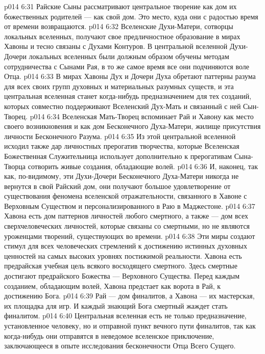 \vs p014 6:31 Райские Сыны рассматривают центральное творение как дом их божественных родителей --- как свой дом. Это место, куда они с радостью время от времени возвращаются.
\vs p014 6:32 \pc {}\bibnobreakspace {} Вселенские Духи\hyp{}Матери, сотворцы локальных вселенных, получают свое предличностное образование в мирах Хавоны и тесно связаны с Духами Контуров. В центральной вселенной Духи\hyp{}Дочери локальных вселенных были должным образом обучены методам сотрудничества с Сынами Рая, в то же самое время все они подчиняются воле Отца.
\vs p014 6:33 В мирах Хавоны Дух и Дочери Духа обретают паттерны разума для всех своих групп духовных и материальных разумных существ, и эта центральная вселенная станет когда\hyp{}нибудь предназначением для тех созданий, которых совместно поддерживают Вселенский Дух\hyp{}Мать и связанный с ней Сын\hyp{}Творец.
\vs p014 6:34 Вселенская Мать\hyp{}Творец вспоминает Рай и Хавону как место своего возникновения и как дом Бесконечного Духа\hyp{}Матери, жилище присутствия личности Бесконечного Разума.
\vs p014 6:35 Из этой центральной вселенной исходил также дар личностных прерогатив творчества, которые Вселенская Божественная Служительница использует дополнительно к прерогативам Сына\hyp{}Творца сотворить живые создания, обладающие волей.
\vs p014 6:36 И, наконец, так как, по\hyp{}видимому, эти Духи\hyp{}Дочери Бесконечного Духа\hyp{}Матери никогда не вернутся в свой Райский дом, они получают большое удовлетворение от существования феномена вселенской отражательности, связанного в Хавоне с Верховным Существом и персонализированного в Раю в Маджестоне.
\vs p014 6:37 \pc {}\bibnobreakspace {} Хавона есть дом паттернов личностей любого смертного, а также --- дом всех сверхчеловеческих личностей, которые связаны со смертными, но не являются уроженцами творений, существующих во времени.
\vs p014 6:38 Эти миры создают стимул для всех человеческих стремлений к достижению истинных духовных ценностей на самых высоких уровнях постижимой реальности. Хавона есть предрайская учебная цель всякого восходящего смертного. Здесь смертные достигают предрайского Божества --- Верховного Существа. Перед каждым созданием, обладающим волей, Хавона предстает как ворота в Рай, к достижению Бога.
\vs p014 6:39 Рай --- дом финалитов, а Хавона --- их мастерская, их площадка для игр. И каждый знающий Бога смертный жаждет стать финалитом.
\vs p014 6:40 Центральная вселенная есть не только предназначение, установленное человеку, но и отправной пункт вечного пути финалитов, так как когда\hyp{}нибудь они отправятся в неведомое вселенское приключение, заключающееся в опыте исследования бесконечности Отца Всего Сущего.
